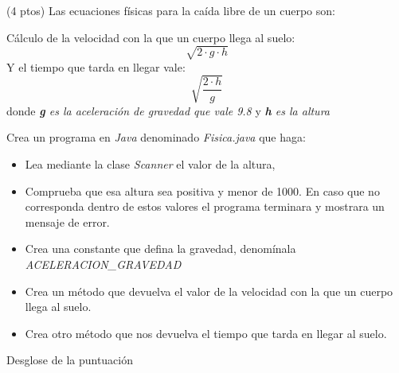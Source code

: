 \documentclass[addpoints,12pt]{exam}
\begin{document}
\begin{questions}
\question(4 ptos) Las ecuaciones físicas para la caída libre de un cuerpo son:\par
Cálculo de la velocidad con la que un cuerpo llega al suelo:
\begin{equation}
\sqrt{2 \cdot g \cdot h}
\end{equation}
Y el tiempo que tarda en llegar vale:
\begin{equation}
\sqrt{\frac{2 \cdot h}{g}}
\end{equation}
donde \emph{\textbf{g} es la aceleración de gravedad que vale 9.8} y \emph{\textbf{h} es la altura}\par 
Crea un programa en \emph{Java} denominado \emph{Fisica.java} que haga:
\begin{itemize}
\item Lea mediante la clase \emph{Scanner} el valor de la altura,
\item Comprueba que esa altura sea positiva y menor de 1000. En caso que no corresponda dentro de estos valores el programa terminara y mostrara un mensaje de error.
\item Crea una constante que defina la gravedad, denomínala \emph{ACELERACION\_GRAVEDAD}
\item Crea un método que devuelva el valor de la velocidad con la que un cuerpo llega al suelo.
\item Crea otro método que nos devuelva el tiempo que tarda en llegar al suelo.
\end{itemize}
Desglose de la puntuación
\end{questions}
\end{document}
